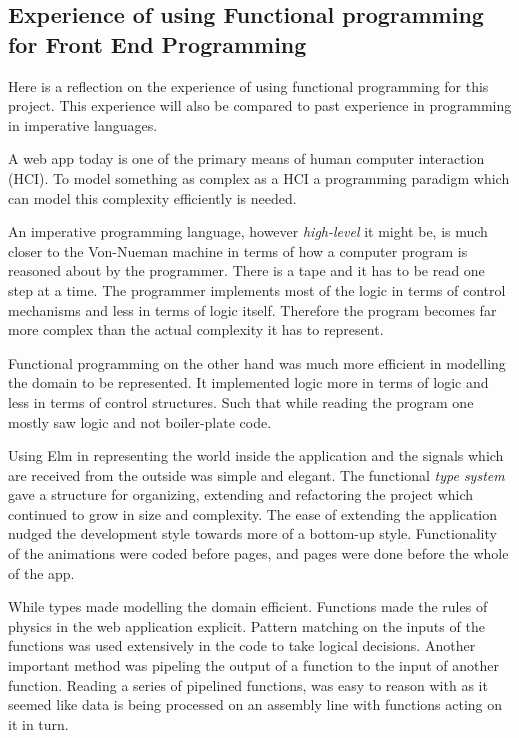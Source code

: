\subsection{Experience of using Functional programming for Front End Programming} 
\label{reflection: functional}

Here is a reflection on the experience of using functional programming for this
project. This experience will also be compared to past experience in
programming in imperative languages.

A web app today is one of the primary means of human computer interaction
(HCI). To model something as complex as a HCI a programming paradigm which can
model this complexity efficiently is needed. 

An imperative programming language, however \emph{high-level} it might be, is
much closer to the Von-Nueman machine in terms of how a computer program is
reasoned about by the programmer. There is a tape and it has to be read one
step at a time. The programmer implements most of the logic in terms of control
mechanisms and less in terms of logic itself. Therefore the program becomes far
more complex than the actual complexity it has to represent. 

Functional programming on the other hand was much more efficient in modelling
the domain to be represented. It implemented logic more in terms of logic and
less in terms of control structures. Such that while reading the program one
mostly saw logic and not boiler-plate code.

Using Elm in representing the world inside the application and the signals
which are received from the outside was simple and elegant. The functional
\emph{type system} gave a structure for organizing, extending and refactoring
the project which continued to grow in size and complexity. The ease of
extending the application nudged the development style towards more of a
bottom-up style. Functionality of the animations were coded before pages, and
pages were done before the whole of the app.

While types made modelling the domain efficient. Functions made the rules of
physics in the web application explicit. Pattern matching on the inputs of the
functions was used extensively in the code to take logical decisions. Another
important method was pipeling the output of a function to the input of another
function. Reading a series of pipelined functions, was easy to reason with as
it seemed like data is being processed on an assembly line with functions
acting on it in turn.

